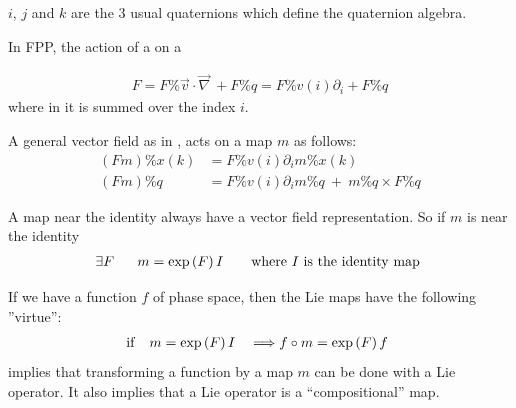 \documentclass{hitec}     %
\begin{document}
{{{{{{{{{{{{{{{{{{$i$, $j$ and $k$ are the 3 usual quaternions which define the quaternion algebra.
 
 In FPP, the action of a  on a 
 
 
%
\begin{align} F=
F\%\vec{v}\cdot \vec{\nabla }\ +F\%q=
F\%v(i){\partial }_{i}+F\%q\label{hop}\end{align}
%
where in  it is summed over the index $i$.

A general vector field as in , acts on a map $m$  as    follows:
%
\begin{align} \left({Fm}\right)\%x(k)&=F\%v(i){\partial }_{i}m\%x(k)\nonumber \\
 \left({Fm}\right)\%q&=F\%v(i){\partial }_{i}m\%q\ +\ m\%q\times F\%q \end{align}



A map near the identity always have a vector field representation. So if $m$ is near  the identity
%
\begin{align} \exists F\ \ \ \ \ m=
\exp\left({F}\right)I\ \ ~~~~{\rm w}{\rm h}{\rm e}{\rm r}{\rm e}~I~{\rm i}{\rm s}~{\rm t}{\rm h}{\rm e}~{\rm i}{\rm d} {\rm e}{\rm n}{\rm t}{\rm i}{\rm t}{\rm y}~{\rm m}{\rm a}{\rm p}~\label{eq:liemapf} \end{align}

 If we have a function $f$ of phase space, then the Lie maps have the following ''virtue'':
\begin{align} \ {\rm i}{\rm f}~~~m=
\exp\left({F}\right)I\ \ \ \Longrightarrow    f\circ m=
\exp\left({F}\right)f\ \ \label{eq:liemapff} \end{align}
%
%
 implies that transforming a function by a map $m$ can be done with a Lie operator. It also implies that a Lie operator is a ``compositional'' map.

}}}}}}}}}}}}}}}}}}
\end{document}
